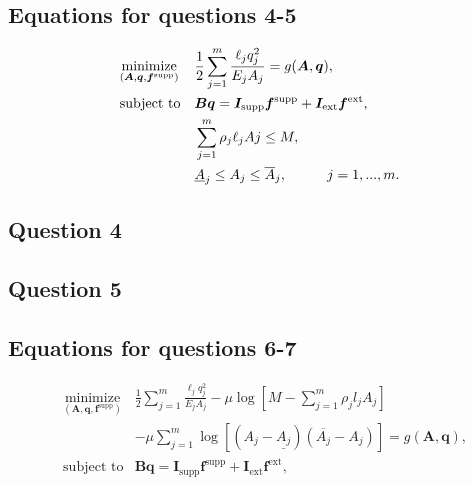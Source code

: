 \documentclass[10pt,a4paper]{article}
\begin{document}
\subsection*{Equations for questions 4-5}

\begin{equation}
 \begin{aligned}
 \label{eq:system6}
 & \underset{(\bm{A},\bm{q},\bm{f}^{\textrm{supp}})}{\text{minimize}}
 & & \frac{1}{2}\sum_{j=1}^{m}\frac{\ell_{j}q_{j}^{2}}{E_{j}A_{j}} = g(\bm{A}, \bm{q}), \\
 & \text{subject to}
 & & \bm{Bq} = \bm{I}_{\textrm{supp}}\bm{f}^{\textrm{supp}} + \bm{I}_{\textrm{ext}}\bm{f}^{\textrm{ext}},\\
 & & & \sum_{j=1}^{m}{\rho_{j}\ell_{j}A{j}} \leq M,\\
 & & & \underline{A}_{j} \leq A_{j} \leq \overline{A}_{j}, \hspace{10 mm}  j = 1,...,m.
 \end{aligned}
\end{equation}



\subsection*{Question 4}



\subsection*{Question 5}


\subsection*{Equations for questions 6-7}

\begin{equation}
 \begin{aligned}
 \label{eq:system7}
 & \underset{(\bm{A},\bm{q},\bm{f}^{\textrm{supp}})}{\text{minimize}} & \frac{1}{2}\sum_{j=1}^{m}\frac{\ell_{j}q_{j}^{2}}{E_{j}A_{j}} -\mu \log[M - \sum\limits_{j=1}^m\rho_{j}l_{j}A_{j}] \\
 & &-\mu\sum\limits_{j=1}^m\log[(A_{j}-\underline{A_{j}})(\overline{A_{j}} - A_{j})] = g(\bm{A}, \bm{q}), \\
 & \text{subject to}
 & \bm{Bq} = \bm{I}_{\textrm{supp}}\bm{f}^{\textrm{supp}} + \bm{I}_{\textrm{ext}}\bm{f}^{\textrm{ext}},\\
 \end{aligned}
\end{equation}
\end{document}
